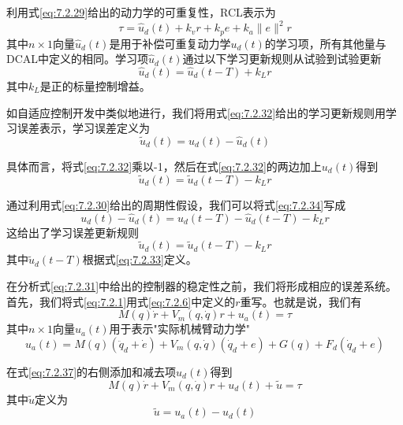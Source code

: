 \documentclass[UTF8]{ctexart}
\begin{document}
利用式\eqref{eq:7.2.29}给出的动力学的可重复性，RCL表示为
\begin{equation}\label{eq:7.2.31}
\tau = \hat{u}_d(t) + k_v r + k_p e + k_a\|e\|^2r
\end{equation}
其中$n \times 1$向量$\hat{u}_d(t)$是用于补偿可重复动力学$u_d(t)$的学习项，所有其他量与DCAL中定义的相同。学习项$\hat{u}_d(t)$通过以下学习更新规则从试验到试验更新
\begin{equation}\label{eq:7.2.32}
\hat{u}_d(t) = \hat{u}_d(t-T) + k_L r
\end{equation}
其中$k_L$是正的标量控制增益。

如自适应控制开发中类似地进行，我们将用式\eqref{eq:7.2.32}给出的学习更新规则用学习误差表示，学习误差定义为
\begin{equation}\label{eq:7.2.33}
\tilde{u}_d(t) = u_d(t) - \hat{u}_d(t)
\end{equation}

具体而言，将式\eqref{eq:7.2.32}乘以-1，然后在式\eqref{eq:7.2.32}的两边加上$u_d(t)$得到
\begin{equation}\label{eq:7.2.34}
\tilde{u}_d(t) = \tilde{u}_d(t-T) - k_L r
\end{equation}

通过利用式\eqref{eq:7.2.30}给出的周期性假设，我们可以将式\eqref{eq:7.2.34}写成
\begin{equation}\label{eq:7.2.35}
u_d(t) - \hat{u}_d(t) = u_d(t-T) - \hat{u}_d(t-T) - k_L r
\end{equation}
这给出了学习误差更新规则
\begin{equation}\label{eq:7.2.36}
\tilde{u}_d(t) = \tilde{u}_d(t-T) - k_L r
\end{equation}
其中$\tilde{u}_d(t-T)$根据式\eqref{eq:7.2.33}定义。

在分析式\eqref{eq:7.2.31}中给出的控制器的稳定性之前，我们将形成相应的误差系统。首先，我们将式\eqref{eq:7.2.1}用式\eqref{eq:7.2.6}中定义的$r$重写。也就是说，我们有
\begin{equation}\label{eq:7.2.37}
M(q)\dot{r} + V_m(q,\dot{q})r + u_a(t) = \tau
\end{equation}
其中$n \times 1$向量$u_a(t)$用于表示"实际机械臂动力学"
\begin{equation}\label{eq:7.2.38}
u_a(t) = M(q)(\ddot{q}_d + \dot{e}) + V_m(q,\dot{q})(\dot{q}_d + e) + G(q) + F_d(\dot{q}_d + e)
\end{equation}

在式\eqref{eq:7.2.37}的右侧添加和减去项$u_d(t)$得到
\begin{equation}\label{eq:7.2.39}
M(q)\dot{r} + V_m(q,\dot{q})r + u_d(t) + \tilde{u} = \tau
\end{equation}
其中$\tilde{u}$定义为
\begin{equation}\label{eq:7.2.40}
\tilde{u} = u_a(t) - u_d(t)
\end{equation}
\end{document}

